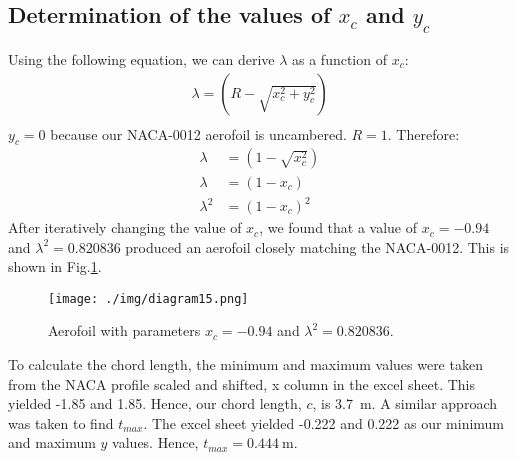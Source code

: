 \subsection{Determination of the values of $x_c$ and $y_c$ }
Using the following equation, we can derive $\lambda$ as a function of $x_c$:
\begin{align}
    \lambda = \left(R - \sqrt{x_c^2 + y_c^2}\right) \\
\end{align}
$y_c = 0$ because our NACA-0012 aerofoil is uncambered. $R = 1$. Therefore:
\begin{align}
    \lambda   & = \left(1-\sqrt{x_c^2}\right) \\
    \lambda   & = \left(1-x_c\right)          \\
    \lambda^2 & = \left(1-x_c\right)^2
\end{align}
After iteratively changing the value of $x_c$, we found that a value of $x_c = -0.94$ and $\lambda^2 = 0.820836$ produced an aerofoil closely matching the NACA-0012. This is shown in Fig.\ref{mappedaerofoil}.
\begin{figure}[H]
    \centering
    \texttt{[image: ./img/diagram15.png]}
    \caption{Aerofoil with parameters $x_c = -0.94$ and $\lambda^2 = 0.820836$.}
    \label{mappedaerofoil}
\end{figure}
To calculate the chord length, the minimum and maximum values were taken from the NACA profile scaled and shifted, x column in the excel sheet. This yielded -1.85 and 1.85. Hence, our chord length, $c$, is \SI{3.7}{\metre}. A similar approach was taken to find $t_{max}$. The excel sheet yielded -0.222 and 0.222 as our minimum and maximum $y$ values. Hence, $t_{max} = \SI{0.444}{\metre}$.
